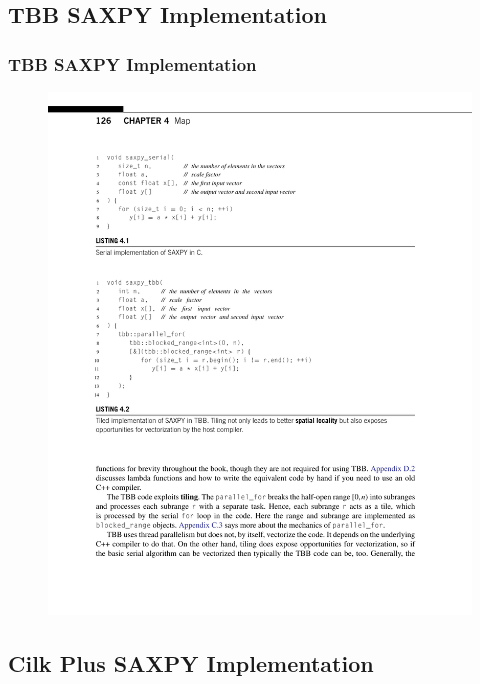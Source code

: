 \documentclass[xcolor=dvipsnames]{beamer}
\begin{document}
	\subsection{TBB SAXPY Implementation}
	
		\begin{frame} \frametitle{TBB SAXPY Implementation}
			\begin{figure}
				\centering
				\includegraphics[width=115mm]{images/listing-4-2.pdf}
			\end{figure}
		\end{frame}
		
	\subsection{Cilk Plus SAXPY Implementation}
	
\end{document}
